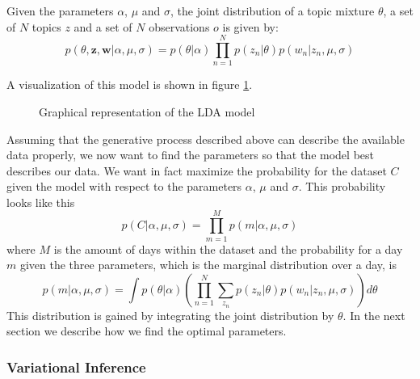 \documentclass[11pt,a4paper]{article}
\begin{document}
Given the parameters $\alpha$, $\mu$ and $\sigma$, the joint distribution of a topic mixture $\theta$, a set of $N$ topics $z$ and a set of $N$ observations $o$ is given by:
\begin{equation}
 p(\theta,\textbf{z},\textbf{w}|\alpha,\mu,\sigma) = p(\theta|\alpha) \prod_{n=1}^N p(z_n|\theta) p(w_n|z_n,\mu,\sigma)
\end{equation}


A visualization of this model is shown in figure \ref{fig:modelExt}.

\begin{figure}[t!]
\centering
\def\svgwidth{0.8\textwidth}

\caption{Graphical representation of the LDA model}
\label{fig:modelExt}
\end{figure}


  
Assuming that the generative process described above can describe the available data properly, we now want to find the parameters so that the model best describes our data. We want in fact maximize the probability for the dataset $C$ given the model with respect to the parameters $\alpha$, $\mu$ and $\sigma$. This probability looks like this
\begin{equation}
p(C|\alpha,\mu,\sigma) = \prod_{m=1}^M p(m|\alpha,\mu,\sigma)
\end{equation}
where $M$ is the amount of days within the dataset and the probability for a day $m$ given the three parameters, which is the marginal distribution over a day, is
\begin{equation} 
p(m|\alpha,\mu,\sigma) = \int p(\theta|\alpha)  \left( \prod_{n=1}^N \sum_{z_n} p(z_n|\theta) p(w_n|z_n, \mu,\sigma)  \right) d\theta
\end{equation}
This distribution is gained by integrating the joint distribution by $\theta$.
In the next section we describe how we find the optimal parameters.



  
  \subsubsection{Variational Inference}
 
\end{document}
